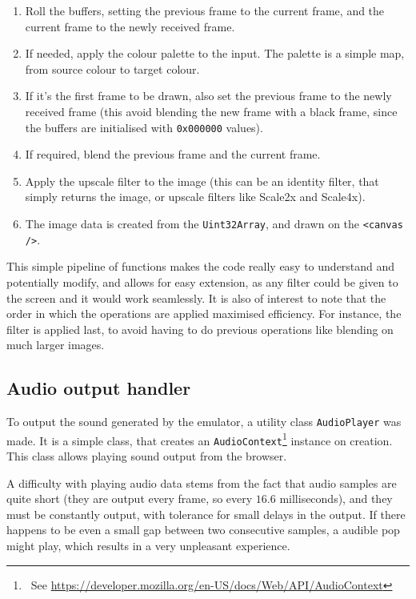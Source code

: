 \documentclass[11pt]{informatics-report}
\newcommand{\ftnt}[1]{\footnote{~See \url{#1}}}
\begin{document}
\begin{enumerate}[itemsep=0mm]
	\item Roll the buffers, setting the previous frame to the current frame, and the current frame to the newly received frame.
	\item If needed, apply the colour palette to the input. The palette is a simple map, from source colour to target colour.
	\item If it's the first frame to be drawn, also set the previous frame to the newly received frame (this avoid blending the new frame with a black frame, since the buffers are initialised with \texttt{0x000000} values).
	\item If required, blend the previous frame and the current frame.
	\item Apply the upscale filter to the image (this can be an identity filter, that simply returns the image, or upscale filters like Scale2x and Scale4x).
	\item The image data is created from the \texttt{Uint32Array}, and drawn on the \texttt{<canvas />}.
\end{enumerate}

This simple pipeline of functions makes the code really easy to understand and potentially modify, and allows for easy extension, as any filter could be given to the screen and it would work seamlessly. It is also of interest to note that the order in which the operations are applied maximised efficiency. For instance, the filter is applied last, to avoid having to do previous operations like blending on much larger images.

\subsection{Audio output handler}

To output the sound generated by the emulator, a utility class \texttt{AudioPlayer} was made. It is a simple class, that creates an \texttt{AudioContext}\ftnt{https://developer.mozilla.org/en-US/docs/Web/API/AudioContext} instance on creation. This class allows playing sound output from the browser.

A difficulty with playing audio data stems from the fact that audio samples are quite short (they are output every frame, so every $16.6$ milliseconds), and they must be constantly output, with tolerance for small delays in the output. If there happens to be even a small gap between two consecutive samples, a audible pop might play, which results in a very unpleasant experience.
\end{document}
